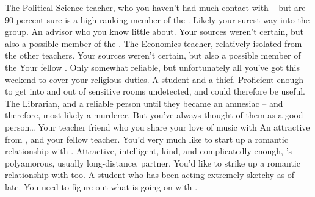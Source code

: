 \documentclass[char]{GL2020}
\begin{document}
\begin{itemz}[Notes]
	\item 
\end{itemz}

\begin{contacts}
	\contact{\cChupInventor{}} The Political Science teacher, who you haven’t had much contact with -- but are 90 percent sure is a high ranking member of the \pGoaties{}. Likely your surest way into the group.
\contact{\cWildCard{}} An advisor who you know little about. Your sources weren’t certain, but also a possible member of the \pGoaties{}. 
	\contact{\cChupSecond{}} The Economics teacher, relatively isolated from the other teachers. Your sources weren’t certain, but also a possible member of the \pGoaties{}
	\contact{\cHedonist{}} Your fellow \pFarm{} \cHedonist{\cleric}. Only somewhat reliable, but unfortunately all you’ve got this weekend to cover your religious duties. 
	\contact{\cPirateChild{}} A student and a thief. Proficient enough to get into and out of sensitive rooms undetected, and could therefore be useful.  
	\contact{\cLibrarian{}} The Librarian, and a reliable person until they became an amnesiac -- and therefore, most likely a murderer. But you’ve always thought of them as a good person\ldots 
	\contact{\cMusic{}} Your teacher friend who you share your love of music with 
\contact{\cBeetle{}} An attractive \cBeetle{\cleric} from \pTech{}, and your fellow teacher. You’d very much like to start up a romantic relationship with \cBeetle{\them}.
	\contact{\cJuniorStatesman{}} Attractive, intelligent, kind, and complicatedly enough, \cBeetle{}’s polyamorous, usually long-distance, partner. You’d like to strike up a romantic relationship with \cJuniorStatesman{\them} too.
	\contact{\cLibAssist{}} A \pFarm{} student who has been acting extremely sketchy as of late. You need to figure out what is going on with \cLibAssist{\them}.
\end{contacts}
\end{document}
